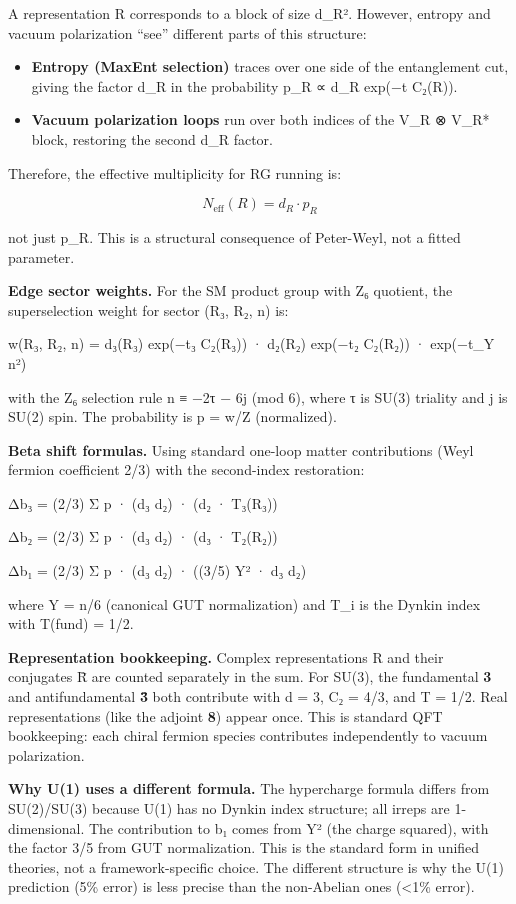 \documentclass[
]{article}
\begin{document}
A representation R corresponds to a block of size d\_R². However,
entropy and vacuum polarization ``see'' different parts of this
structure:

\begin{itemize}
\item
  \textbf{Entropy (MaxEnt selection)} traces over one side of the
  entanglement cut, giving the factor d\_R in the probability p\_R ∝
  d\_R exp(−t C₂(R)).
\item
  \textbf{Vacuum polarization loops} run over both indices of the V\_R ⊗
  V\_R* block, restoring the second d\_R factor.
\end{itemize}

Therefore, the effective multiplicity for RG running is:

\[
N_{\text{eff}}(R) = d_R \cdot p_R
\]

not just p\_R. This is a structural consequence of Peter-Weyl, not a
fitted parameter.

\textbf{Edge sector weights.} For the SM product group with Z₆ quotient,
the superselection weight for sector (R₃, R₂, n) is:

w(R₃, R₂, n) = d₃(R₃) exp(−t₃ C₂(R₃)) · d₂(R₂) exp(−t₂ C₂(R₂)) ·
exp(−t\_Y n²)

with the Z₆ selection rule n ≡ −2τ − 6j (mod 6), where τ is SU(3)
triality and j is SU(2) spin. The probability is p = w/Z (normalized).

\textbf{Beta shift formulas.} Using standard one-loop matter
contributions (Weyl fermion coefficient 2/3) with the second-index
restoration:

Δb₃ = (2/3) Σ p · (d₃ d₂) · (d₂ · T₃(R₃))

Δb₂ = (2/3) Σ p · (d₃ d₂) · (d₃ · T₂(R₂))

Δb₁ = (2/3) Σ p · (d₃ d₂) · ((3/5) Y² · d₃ d₂)

where Y = n/6 (canonical GUT normalization) and T\_i is the Dynkin index
with T(fund) = 1/2.

\textbf{Representation bookkeeping.} Complex representations R and their
conjugates R̄ are counted separately in the sum. For SU(3), the
fundamental \textbf{3} and antifundamental \textbf{3̄} both contribute
with d = 3, C₂ = 4/3, and T = 1/2. Real representations (like the
adjoint \textbf{8}) appear once. This is standard QFT bookkeeping: each
chiral fermion species contributes independently to vacuum polarization.

\textbf{Why U(1) uses a different formula.} The hypercharge formula
differs from SU(2)/SU(3) because U(1) has no Dynkin index structure; all
irreps are 1-dimensional. The contribution to b₁ comes from Y² (the
charge squared), with the factor 3/5 from GUT normalization. This is the
standard form in unified theories, not a framework-specific choice. The
different structure is why the U(1) prediction (5\% error) is less
precise than the non-Abelian ones (\textless1\% error).
\end{document}
